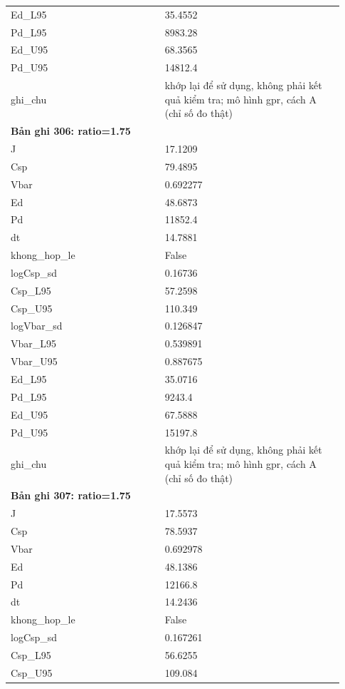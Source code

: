 \begin{longtable}{p{0.43\linewidth}p{0.50\linewidth}}
Ed\_\allowbreak L95 & 35.4552 \\
Pd\_\allowbreak L95 & 8983.28 \\
Ed\_\allowbreak U95 & 68.3565 \\
Pd\_\allowbreak U95 & 14812.4 \\
ghi\_\allowbreak chu & khớp lại để sử dụng, không phải kết quả kiểm tra; mô hình gpr, cách A (chỉ số đo thật) \\
\midrule
\multicolumn{2}{p{0.95\linewidth}}{\textbf{Bản ghi 306: ratio=1.75}} \\
J & 17.1209 \\
Csp & 79.4895 \\
Vbar & 0.692277 \\
Ed & 48.6873 \\
Pd & 11852.4 \\
dt & 14.7881 \\
khong\_\allowbreak hop\_\allowbreak le & False \\
logCsp\_\allowbreak sd & 0.16736 \\
Csp\_\allowbreak L95 & 57.2598 \\
Csp\_\allowbreak U95 & 110.349 \\
logVbar\_\allowbreak sd & 0.126847 \\
Vbar\_\allowbreak L95 & 0.539891 \\
Vbar\_\allowbreak U95 & 0.887675 \\
Ed\_\allowbreak L95 & 35.0716 \\
Pd\_\allowbreak L95 & 9243.4 \\
Ed\_\allowbreak U95 & 67.5888 \\
Pd\_\allowbreak U95 & 15197.8 \\
ghi\_\allowbreak chu & khớp lại để sử dụng, không phải kết quả kiểm tra; mô hình gpr, cách A (chỉ số đo thật) \\
\midrule
\multicolumn{2}{p{0.95\linewidth}}{\textbf{Bản ghi 307: ratio=1.75}} \\
J & 17.5573 \\
Csp & 78.5937 \\
Vbar & 0.692978 \\
Ed & 48.1386 \\
Pd & 12166.8 \\
dt & 14.2436 \\
khong\_\allowbreak hop\_\allowbreak le & False \\
logCsp\_\allowbreak sd & 0.167261 \\
Csp\_\allowbreak L95 & 56.6255 \\
Csp\_\allowbreak U95 & 109.084 \\

\end{longtable}
